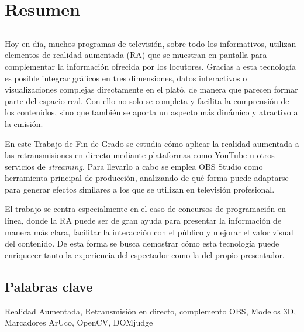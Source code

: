 \chapter*{Resumen}

\section*{\tituloPortadaVal}

Hoy en día, muchos programas de televisión, sobre todo los informativos, utilizan elementos de realidad aumentada (RA) que se muestran en pantalla para complementar la información ofrecida por los locutores. Gracias a esta tecnología es posible integrar gráficos en tres dimensiones, datos interactivos o visualizaciones complejas directamente en el plató, de manera que parecen formar parte del espacio real. Con ello no solo se completa y facilita la comprensión de los contenidos, sino que también se aporta un aspecto más dinámico y atractivo a la emisión.

En este Trabajo de Fin de Grado se estudia cómo aplicar la realidad aumentada a las retransmisiones en directo mediante plataformas como YouTube u otros servicios de \textit{streaming}. Para llevarlo a cabo se emplea OBS Studio como herramienta principal de producción, analizando de qué forma puede adaptarse para generar efectos similares a los que se utilizan en televisión profesional.

El trabajo se centra especialmente en el caso de concursos de programación en línea, donde la RA puede ser de gran ayuda para presentar la información de manera más clara, facilitar la interacción con el público y mejorar el valor visual del contenido. De esta forma se busca demostrar cómo esta tecnología puede enriquecer tanto la experiencia del espectador como la del propio presentador.

\section*{Palabras clave}

\noindent Realidad Aumentada, Retransmisión en directo, complemento OBS, Modelos 3D, Marcadores ArUco, OpenCV, DOMjudge


